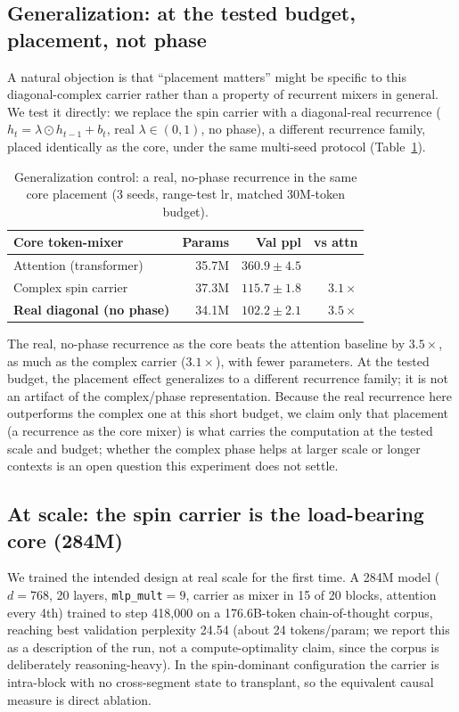 \documentclass[journal]{IEEEtran}
\newcommand{\code}[1]{\texttt{#1}}
\begin{document}
\subsection{Generalization: at the tested budget, placement, not phase}
A natural objection is that ``placement matters'' might be specific to this diagonal-complex carrier rather than a property of recurrent mixers in general. We test it directly: we replace the spin carrier with a diagonal-real recurrence ($h_t = \lambda\odot h_{t-1} + b_t$, real $\lambda\in(0,1)$, no phase), a different recurrence family, placed identically as the core, under the same multi-seed protocol (Table~\ref{tab:gen}).

\begin{table}[t]\centering\small
\caption{Generalization control: a real, no-phase recurrence in the same core placement (3 seeds, range-test lr, matched 30M-token budget).}
\label{tab:gen}
\begin{tabular}{@{}l r r r@{}}
\toprule
Core token-mixer & Params & Val ppl & vs attn \\
\midrule
Attention (transformer) & 35.7M & $360.9 \pm 4.5$ & \\
Complex spin carrier & 37.3M & $\mathbf{115.7 \pm 1.8}$ & $3.1\times$ \\
\textbf{Real diagonal (no phase)} & 34.1M & $\mathbf{102.2 \pm 2.1}$ & $3.5\times$ \\
\bottomrule
\end{tabular}
\end{table}

The real, no-phase recurrence as the core beats the attention baseline by $3.5\times$, as much as the complex carrier ($3.1\times$), with fewer parameters. At the tested budget, the placement effect generalizes to a different recurrence family; it is not an artifact of the complex/phase representation. Because the real recurrence here outperforms the complex one at this short budget, we claim only that placement (a recurrence as the core mixer) is what carries the computation at the tested scale and budget; whether the complex phase helps at larger scale or longer contexts is an open question this experiment does not settle.

\subsection{At scale: the spin carrier is the load-bearing core (284M)}
We trained the intended design at real scale for the first time. A 284M model ($d=768$, 20 layers, \code{mlp\_mult}$=9$, carrier as mixer in 15 of 20 blocks, attention every 4th) trained to step 418{,}000 on a 176.6B-token chain-of-thought corpus, reaching best validation perplexity 24.54 (about 24 tokens/param; we report this as a description of the run, not a compute-optimality claim, since the corpus is deliberately reasoning-heavy). In the spin-dominant configuration the carrier is intra-block with no cross-segment state to transplant, so the equivalent causal measure is direct ablation.
\end{document}
